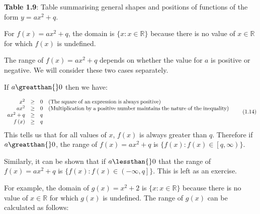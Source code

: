 \begin{center}{\small\bfseries Table 1.9}: Table summarising general shapes and positions of functions of the form $y=a{x}^{2}+q$.\end{center}
\par
{}
\label{m39345*uid117}
\nopagebreak
\label{m39345*id242046}For $f\left(x\right)=a{x}^{2}+q$, the domain is $\{x:x\in \mathbb{R}\}$ because there is no value of $x\in \mathbb{R}$ for which $f\left(x\right)$ is undefined.\par 
\label{m39345*id242145}The range of $f\left(x\right)=a{x}^{2}+q$ depends on whether the value for $a$ is positive or negative. We will consider these two cases separately.\par 
\label{m39345*id242193}If $a\greatthan{}0$ then we have:\par 
\label{m39345*id242213}\nopagebreak\noindent{}
\begin{equation}
\begin{array}{cccc}\hfill {x}^{2}& \ge & 0\hfill & \left(\mathrm{The\; square\; of\; an\; expression\; is\; always\; positive}\right)\hfill \\ \hfill a{x}^{2}& \ge & 0\hfill & \left(\mathrm{Multiplication\; by\; a\; positive\; number\; maintains\; the\; nature\; of\; the\; inequality}\right)\hfill \\ \hfill a{x}^{2}+q& \ge & q\hfill & \\ \hfill f\left(x\right)& \ge & q\hfill & \end{array}\tag{1.14}
\end{equation}
\label{m39345*id242387}This tells us that for all values of $x$, $f\left(x\right)$ is always greater than $q$. Therefore if $a\greatthan{}0$, the range of $f\left(x\right)=a{x}^{2}+q$ is $\{f\left(x\right):f\left(x\right)\in \left[q,\infty \right)\}$.\par 
\label{m39345*id242519}Similarly, it can be shown that if $a\lessthan{}0$ that the range of $f\left(x\right)=a{x}^{2}+q$ is $\{f\left(x\right):f\left(x\right)\in \left(-\infty ,q\right]\}$. This is left as an exercise.\par 
\label{m39345*id242620}For example, the domain of $g\left(x\right)={x}^{2}+2$ is $\{x:x\in \mathbb{R}\}$ because there is no value of $x\in \mathbb{R}$ for which $g\left(x\right)$ is undefined. The range of $g\left(x\right)$ can be calculated as follows:\par 
